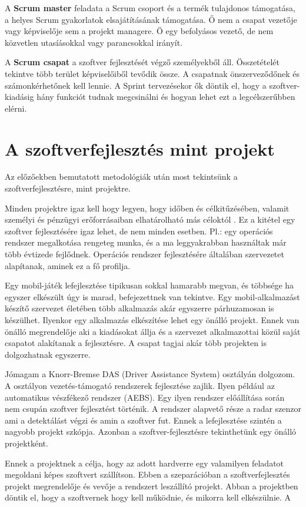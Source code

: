 \documentclass[a4paper,12pt,leqno, notitlepage]{article}%
\begin{document}
A \textbf{Scrum master} feladata a Scrum csoport és a termék tulajdonos támogatása, a helyes Scrum gyakorlatok elsajátításának támogatása. Ő nem a csapat vezetője vagy képviselője sem a projekt managere. Ö egy befolyásos vezető, de nem közvetlen utasíásokkal vagy parancsokkal irányít. \cite{scrum_roles}

A \textbf{Scrum csapat} a szoftver fejlesztését végző személyekből áll. Összetételét tekintve több terület képviselőiből tevődik össze. A csapatnak önszerveződőnek és számonkérhetőnek kell lennie. A Sprint tervezésekor ők döntik el, hogy a szoftver-kiadásig hány funkciót tudnak megcsinálni és hogyan lehet ezt a legcélszerűbben elérni.\cite{scrum_roles}
 
\section{A szoftver\-fejlesztés mint projekt}

Az előzőekben bemutatott metodológiák után most tekintsünk a szoftverfejlesztésre, mint projektre.

Minden projektre igaz kell hogy legyen, hogy időben és célkitűzésében, valamit személyi és pénzügyi erőforrásaiban elhatárolható más céloktól \cite{proj_fogalom}. Ez a kitétel egy szoftver fejlesztésére igaz lehet, de nem minden esetben. Pl.: egy operációs rendszer megalkotása rengeteg munka, és a ma leggyakrabban használtak már több évtizede fejlődnek. Operációs rendszer fejlesztésére általában szervezetet alapítanak, aminek ez a fő profilja. 

Egy mobil-játék lefejlesztése tipikusan sokkal hamarabb megvan, és többsége ha egyszer elkészült úgy is marad, befejezettnek van tekintve. Egy mobil-alkalmazást készítő szervezet életében több alkalmazás akár egyszerre párhuzamosan is készülhet. Ilyenkor egy alkalmazás elkészítése lehet egy önálló projekt. Ennek van önálló megrendelője aki a kiadásokat állja és a szervezet alkalmazottai közül saját csapatot alakítanak a fejlesztésre. A csapat tagjai akár több projekten is dolgozhatnak egyszerre.

Jómagam a Knorr-Bremse DAS (Driver Assistance System) osztályán dolgozom. A osztályon vezetés-támogató rendszerek fejlesztése zajlik. Ilyen például az automatikus vészfékező rendszer (AEBS). Egy ilyen rendszer előállítása során nem csupán szoftver fejlesztést történik. A rendszer alapvető része a radar szenzor ami a detektálást végzi és amin a szoftver fut. Ennek a lefejlesztése szintén a nagyobb projekt szkópja. Azonban a szoftver-fejlesztésre tekinthetünk egy önálló projektként.

Ennek a projektnek a célja, hogy az adott hardverre egy valamilyen feladatot megoldani képes szoftvert szállítson. Ebben a szeparációban a szoftverfejlesztés projekt megrendelője és vevője a rendszert leszállító projekt. Abban a projektben döntik el, hogy a szoftvernek hogy kell működnie, és mikorra kell elkészülnie. A 

{}

\end{document}
